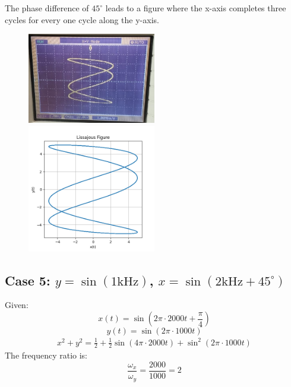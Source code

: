 \documentclass{article}
\begin{document}
The phase difference of \( 45^\circ \) leads to a figure where the x-axis completes three cycles for every one cycle along the y-axis.
\begin{figure}[H]
\centering
\includegraphics[width=0.5\textwidth]{figs/fig4.png}
\includegraphics[width=0.5\textwidth]{figs/fig4_verify.png}
\end{figure}
\subsection{Case 5: $y = \sin(1\text{kHz})$, $x = \sin(2\text{kHz} + 45^\circ)$}

Given:
\[
x(t) = \sin(2\pi \cdot 2000 t + \frac{\pi}{4})
\]
\[
y(t) = \sin(2\pi \cdot 1000 t)
\]
\begin{align*}
x^2 + y^2 = \frac{1}{2} + \frac{1}{2} \sin\left( 4\pi \cdot 2000 t \right) + \sin^2\left( 2\pi \cdot 1000 t \right)
\end{align*}
The frequency ratio is:
\[
\frac{\omega_x}{\omega_y} = \frac{2000}{1000} = 2
\]
\end{document}
